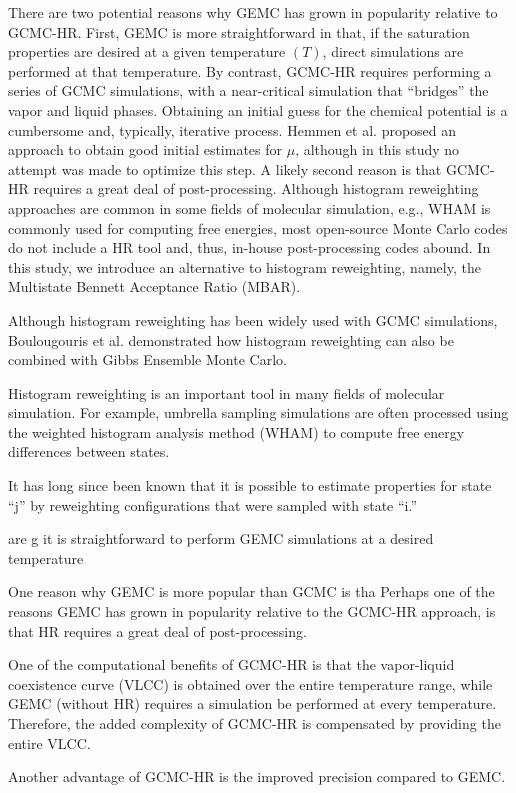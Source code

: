 \documentclass[11pt,a4paper]{article}
\begin{document}
There are two potential reasons why GEMC has grown in popularity relative to GCMC-HR. First, GEMC is more straightforward in that, if the saturation properties are desired at a given temperature $(T)$, direct simulations are performed at that temperature. By contrast, GCMC-HR requires performing a series of GCMC simulations, with a near-critical simulation that ``bridges'' the vapor and liquid phases. Obtaining an initial guess for the chemical potential is a cumbersome and, typically, iterative process. Hemmen et al. proposed an approach to obtain good initial estimates for $\mu$, although in this study no attempt was made to optimize this step. A likely second reason is that GCMC-HR requires a great deal of post-processing. Although histogram reweighting approaches are common in some fields of molecular simulation, e.g., WHAM is commonly used for computing free energies, most open-source Monte Carlo codes do not include a HR tool and, thus, in-house post-processing codes abound. In this study, we introduce an alternative to histogram reweighting, namely, the Multistate Bennett Acceptance Ratio (MBAR). 

Although histogram reweighting has been widely used with GCMC simulations, Boulougouris et al. demonstrated how histogram reweighting can also be combined with Gibbs Ensemble Monte Carlo. 

Histogram reweighting is an important tool in many fields of molecular simulation. For example, umbrella sampling simulations are often processed using the weighted histogram analysis method (WHAM) to compute free energy differences between states. 

It has long since been known that it is possible to estimate properties for state ``j'' by reweighting configurations that were sampled with state ``i.'' 

 are g  it is straightforward to perform GEMC simulations at a desired temperature

One reason why GEMC is more popular than GCMC is tha
Perhaps one of the reasons GEMC has grown in popularity relative to the GCMC-HR approach, is that HR requires a great deal of post-processing. 

One of the computational benefits of GCMC-HR is that the vapor-liquid coexistence curve (VLCC) is obtained over the entire temperature range, while GEMC (without HR) requires a simulation be performed at every temperature. Therefore, the added complexity of GCMC-HR is compensated by providing the entire VLCC.

Another advantage of GCMC-HR is the improved precision compared to GEMC.
\end{document}
